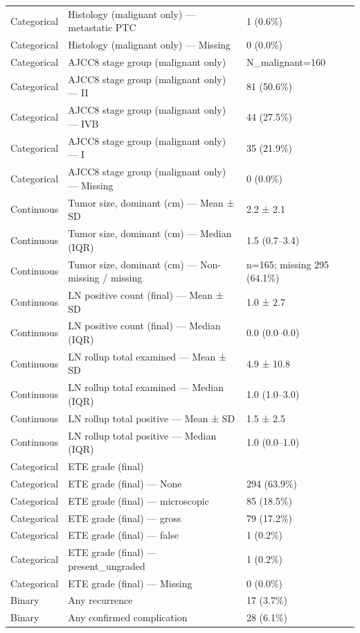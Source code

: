 \begin{table}[htbp]
\begin{tabular}{lll}
Categorical & Histology (malignant only) — metastatic PTC & 1 (0.6\%) \\
Categorical & Histology (malignant only) — Missing & 0 (0.0\%) \\
Categorical & AJCC8 stage group (malignant only) & N\_malignant=160 \\
Categorical & AJCC8 stage group (malignant only) — II & 81 (50.6\%) \\
Categorical & AJCC8 stage group (malignant only) — IVB & 44 (27.5\%) \\
Categorical & AJCC8 stage group (malignant only) — I & 35 (21.9\%) \\
Categorical & AJCC8 stage group (malignant only) — Missing & 0 (0.0\%) \\
Continuous & Tumor size, dominant (cm) — Mean ± SD & 2.2 ± 2.1 \\
Continuous & Tumor size, dominant (cm) — Median (IQR) & 1.5 (0.7–3.4) \\
Continuous & Tumor size, dominant (cm) — Non-missing / missing & n=165; missing 295 (64.1\%) \\
Continuous & LN positive count (final) — Mean ± SD & 1.0 ± 2.7 \\
Continuous & LN positive count (final) — Median (IQR) & 0.0 (0.0–0.0) \\
Continuous & LN rollup total examined — Mean ± SD & 4.9 ± 10.8 \\
Continuous & LN rollup total examined — Median (IQR) & 1.0 (1.0–3.0) \\
Continuous & LN rollup total positive — Mean ± SD & 1.5 ± 2.5 \\
Continuous & LN rollup total positive — Median (IQR) & 1.0 (0.0–1.0) \\
Categorical & ETE grade (final) &  \\
Categorical & ETE grade (final) — None & 294 (63.9\%) \\
Categorical & ETE grade (final) — microscopic & 85 (18.5\%) \\
Categorical & ETE grade (final) — gross & 79 (17.2\%) \\
Categorical & ETE grade (final) — false & 1 (0.2\%) \\
Categorical & ETE grade (final) — present\_ungraded & 1 (0.2\%) \\
Categorical & ETE grade (final) — Missing & 0 (0.0\%) \\
Binary & Any recurrence & 17 (3.7\%) \\
Binary & Any confirmed complication & 28 (6.1\%) \\

\end{tabular}
\end{table}
